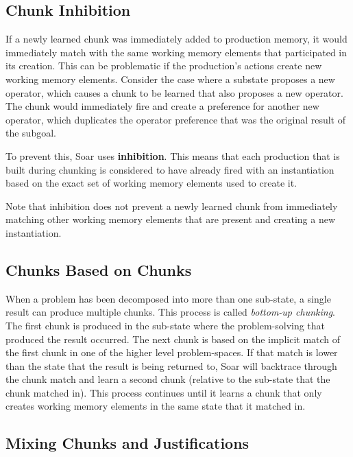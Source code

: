 \subsection{Chunk Inhibition}

If a newly learned chunk was immediately added to production memory, it would immediately match with the same working memory elements that participated in its creation.  This can be problematic if the production's actions create new working memory elements.  Consider the case where a substate proposes a new operator, which causes a chunk to be learned that also proposes a new operator. The chunk would immediately fire and create a preference for another new operator, which duplicates the operator preference that was the original result of the subgoal. 

To prevent this, Soar uses \textbf{inhibition}. This means that each production that is built during chunking is considered to have already fired with an instantiation based on the exact set of working memory elements used to create it. 

Note that inhibition does not prevent a newly learned chunk from immediately matching other working memory elements that are present and creating a new instantiation.

\subsection{Chunks Based on Chunks}

When a problem has been decomposed into more than one sub-state, a single result can produce multiple chunks.  This process is called \textit{bottom-up chunking}.  The first chunk is produced in the sub-state where the problem-solving that produced the result occurred.  The next chunk is based on the implicit match of the first chunk in one of the higher level problem-spaces.  If that match is lower than the state that the result is being returned to, Soar will backtrace through the chunk match and learn a second chunk (relative to the sub-state that the chunk matched in).  This process continues until it learns a chunk that only creates working memory elements in the same state that it matched in.

\subsection{Mixing Chunks and Justifications}
 
